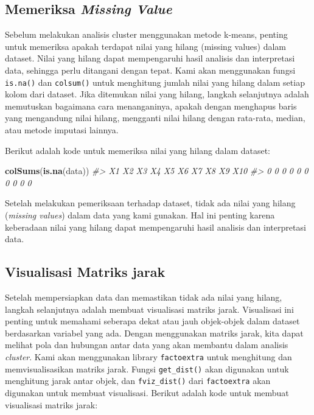 \documentclass[
  oneside]{book}
\newenvironment{Shaded}{\begin{snugshade}}{\end{snugshade}}
\newcommand{\CommentTok}[1]{\textcolor[rgb]{0.56,0.35,0.01}{\textit{#1}}}
\newcommand{\FunctionTok}[1]{\textcolor[rgb]{0.13,0.29,0.53}{\textbf{#1}}}
\newcommand{\NormalTok}[1]{#1}
\begin{document}
\subsection*{\texorpdfstring{Memeriksa \emph{Missing Value}}{Memeriksa Missing Value}}\label{memeriksa-missing-value}

Sebelum melakukan analisis cluster menggunakan metode k-means, penting untuk memeriksa apakah terdapat nilai yang hilang (missing values) dalam dataset. Nilai yang hilang dapat mempengaruhi hasil analisis dan interpretasi data, sehingga perlu ditangani dengan tepat. Kami akan menggunakan fungsi \texttt{is.na()} dan \texttt{colsum()} untuk menghitung jumlah nilai yang hilang dalam setiap kolom dari dataset. Jika ditemukan nilai yang hilang, langkah selanjutnya adalah memutuskan bagaimana cara menanganinya, apakah dengan menghapus baris yang mengandung nilai hilang, mengganti nilai hilang dengan rata-rata, median, atau metode imputasi lainnya.

Berikut adalah kode untuk memeriksa nilai yang hilang dalam dataset:

\begin{Shaded}
\begin{Highlighting}[]
\FunctionTok{colSums}\NormalTok{(}\FunctionTok{is.na}\NormalTok{(data))}
\CommentTok{\#\textgreater{}  X1  X2  X3  X4  X5  X6  X7  X8  X9 X10 }
\CommentTok{\#\textgreater{}   0   0   0   0   0   0   0   0   0   0}
\end{Highlighting}
\end{Shaded}

Setelah melakukan pemeriksaan terhadap dataset, tidak ada nilai yang hilang (\emph{missing values}) dalam data yang kami gunakan. Hal ini penting karena keberadaan nilai yang hilang dapat mempengaruhi hasil analisis dan interpretasi data.

\subsection*{Visualisasi Matriks jarak}\label{visualisasi-matriks-jarak}

Setelah mempersiapkan data dan memastikan tidak ada nilai yang hilang, langkah selanjutnya adalah membuat visualisasi matriks jarak. Visualisasi ini penting untuk memahami seberapa dekat atau jauh objek-objek dalam dataset berdasarkan variabel yang ada. Dengan menggunakan matriks jarak, kita dapat melihat pola dan hubungan antar data yang akan membantu dalam analisis \emph{cluster}. Kami akan menggunakan library \texttt{factoextra} untuk menghitung dan memvisualisasikan matriks jarak. Fungsi \texttt{get\_dist()} akan digunakan untuk menghitung jarak antar objek, dan \texttt{fviz\_dist()} dari \texttt{factoextra} akan digunakan untuk membuat visualisasi. Berikut adalah kode untuk membuat visualisasi matriks jarak:
\end{document}
